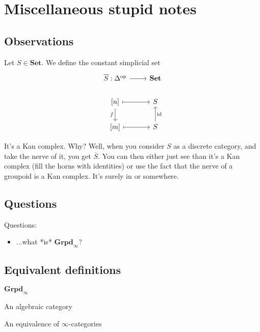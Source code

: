 \documentclass{MetricNotes2023}
\def\id{\ensuremath\text{id}}
\begin{document}



\section{Miscellaneous stupid notes}

\subsection{Observations}

Let \(S \in \textbf{Set}\). We define the constant simplicial set 
\[\begin{tikzcd}
\overline{S} : \Delta^{\text{op}} \arrow[r, ""]  & \textbf{Set} \\
\left[n\right] \arrow[r, mapsto, swap, ""] \arrow[d, swap, "f"] & S\\
\left[m\right] \arrow[r, mapsto, swap, ""] & S \arrow[u, swap, "\id"]
\end{tikzcd}\]

It's a Kan complex. Why? Well, when you consider \(S\) as a discrete category, and take the nerve of it, you get \(\overline{S}\). You can then either just see than it's a Kan complex (fill the horns with identities) or use the fact that the nerve of a groupoid is a Kan complex. It's surely in \autocite{lurie2008higher} or \autocite{kerodon} somewhere. 

\subsection{Questions}

Questions:
\begin{itemize}
\item ...what *is* \(\textbf{Grpd}_\infty\)?
\end{itemize}

\subsection{Equivalent definitions}

\(\textbf{Grpd}_\infty\) 

An algebraic category

An equivalence of \(\infty\)-categories



\printbibliography
\end{document}
